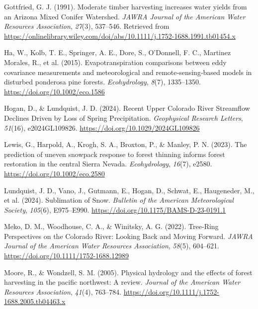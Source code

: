 \documentclass[
]{agujournal2019}
\newlength{\cslhangindent}
\newenvironment{CSLReferences}[2] %
 {\begin{list}{}{%
  \setlength{\itemindent}{0pt}
  \setlength{\leftmargin}{0pt}
  \setlength{\parsep}{0pt}
  \ifodd #1
   \setlength{\leftmargin}{\cslhangindent}
   \setlength{\itemindent}{-1\cslhangindent}
  \fi
  \setlength{\itemsep}{#2\baselineskip}}}
 {\end{list}}
\begin{document}
\begin{CSLReferences}{1}{0}
Gottfried, G. J. (1991). Moderate timber harvesting increases water
yields from an {Arizona} {Mixed} {Conifer} {Watershed}. \emph{JAWRA
Journal of the American Water Resources Association}, \emph{27}(3),
537--546. Retrieved from
\url{https://onlinelibrary.wiley.com/doi/abs/10.1111/j.1752-1688.1991.tb01454.x}

Ha, W., Kolb, T. E., Springer, A. E., Dore, S., O'Donnell, F. C.,
Martinez Morales, R., et al. (2015). Evapotranspiration comparisons
between eddy covariance measurements and meteorological and
remote‐sensing‐based models in disturbed ponderosa pine forests.
\emph{Ecohydrology}, \emph{8}(7), 1335--1350.
\url{https://doi.org/10.1002/eco.1586}

Hogan, D., \& Lundquist, J. D. (2024). Recent {Upper} {Colorado} {River}
{Streamflow} {Declines} {Driven} by {Loss} of {Spring} {Precipitation}.
\emph{Geophysical Research Letters}, \emph{51}(16), e2024GL109826.
\url{https://doi.org/10.1029/2024GL109826}

Lewis, G., Harpold, A., Krogh, S. A., Broxton, P., \& Manley, P. N.
(2023). The prediction of uneven snowpack response to forest thinning
informs forest restoration in the central {Sierra} {Nevada}.
\emph{Ecohydrology}, \emph{16}(7), e2580.
\url{https://doi.org/10.1002/eco.2580}

Lundquist, J. D., Vano, J., Gutmann, E., Hogan, D., Schwat, E.,
Haugeneder, M., et al. (2024). Sublimation of {Snow}. \emph{Bulletin of
the American Meteorological Society}, \emph{105}(6), E975--E990.
\url{https://doi.org/10.1175/BAMS-D-23-0191.1}

Meko, D. M., Woodhouse, C. A., \& Winitsky, A. G. (2022). Tree‐{Ring}
{Perspectives} on the {Colorado} {River}: {Looking} {Back} and {Moving}
{Forward}. \emph{JAWRA Journal of the American Water Resources
Association}, \emph{58}(5), 604--621.
\url{https://doi.org/10.1111/1752-1688.12989}

Moore, R., \& Wondzell, S. M. (2005). Physical hydrology and the effects
of forest harvesting in the pacific northwest: {A} review. \emph{Journal
of the American Water Resources Association}, \emph{41}(4), 763--784.
\url{https://doi.org/10.1111/j.1752-1688.2005.tb04463.x}


\end{CSLReferences}
\end{document}
